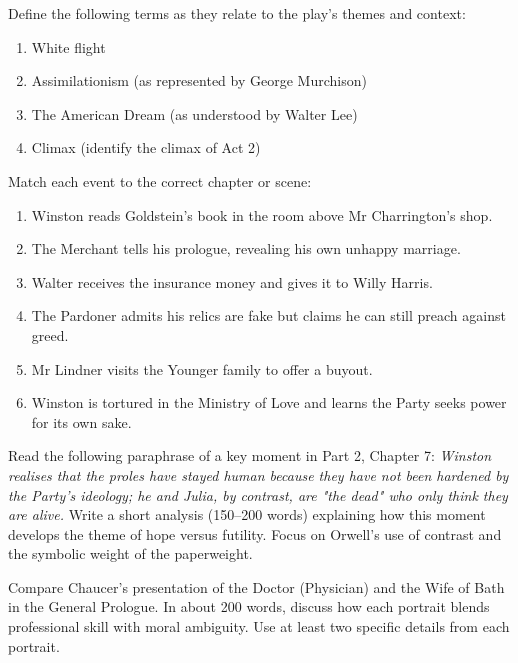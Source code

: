 \documentclass[11pt]{article}
\newcommand{\cle}[1]{{\popxbold\color{popdark}#1}}
\newcounter{popsec}
\newcounter{popsub}
\newcommand{\courssub}[1]{%
  \stepcounter{popsub}%
  \par\vspace{9pt}\noindent{\popxbold\fontsize{11.5}{13}\selectfont\color{popink}{\color{poporange}\thepopsec.\thepopsub}\hspace{6pt}#1}\par\nopagebreak\vspace{4pt}
}
\begin{document}
\begin{exercice}
Define the following terms as they relate to the play's themes and context:
\begin{enumerate}
\item \cle{White flight}
\item \cle{Assimilationism} (as represented by George Murchison)
\item \cle{The American Dream} (as understood by Walter Lee)
\item \cle{Climax} (identify the climax of Act 2)
\end{enumerate}
\end{exercice}

\begin{exercice}
Match each event to the correct chapter or scene:
\begin{enumerate}
\item Winston reads Goldstein's book in the room above Mr Charrington's shop.
\item The Merchant tells his prologue, revealing his own unhappy marriage.
\item Walter receives the insurance money and gives it to Willy Harris.
\item The Pardoner admits his relics are fake but claims he can still preach against greed.
\item Mr Lindner visits the Younger family to offer a buyout.
\item Winston is tortured in the Ministry of Love and learns the Party seeks power for its own sake.
\end{enumerate}
\end{exercice}

\courssub{I practise}
\begin{exercice}
Read the following paraphrase of a key moment in Part 2, Chapter 7: \emph{Winston realises that the proles have stayed human because they have not been hardened by the Party's ideology; he and Julia, by contrast, are "the dead" who only think they are alive.} Write a short analysis (150–200 words) explaining how this moment develops the theme of hope versus futility. Focus on Orwell's use of contrast and the symbolic weight of the paperweight.
\end{exercice}

\begin{exercice}
Compare Chaucer's presentation of the Doctor (Physician) and the Wife of Bath in the General Prologue. In about 200 words, discuss how each portrait blends professional skill with moral ambiguity. Use at least two specific details from each portrait.
\end{exercice}
\end{document}
